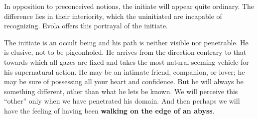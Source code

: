 In opposition to preconceived notions, the initiate will appear quite ordinary. The difference lies in their interiority, which the uninitiated are incapable of recognizing. Evola offers this portrayal of the initiate.

\begin{quotex}
The initiate is an occult being and his path is neither visible nor penetrable. He is elusive, not to be pigeonholed. He arrives from the direction contrary to that towards which all gazes are fixed and takes the most natural seeming vehicle for his supernatural action. He may be an intimate friend, companion, or lover; he may be sure of possessing all your heart and confidence. But he will always be something different, other than what he lets be known. We will perceive this ``other'' only when we have penetrated his domain. And then perhaps we will have the feeling of having been \textbf{walking on the edge of an abyss}.
\end{quotex}



